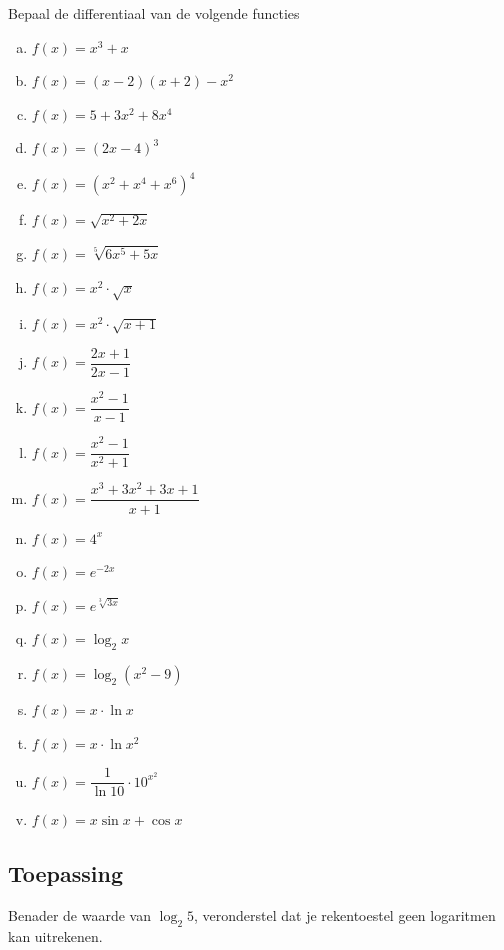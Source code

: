 \documentclass[a4paper,12pt]{article}
\begin{document}
\begin{oefening}
Bepaal de differentiaal van de volgende functies
\begin{multicols}{2}
\begin{enumerate}[(a)]
  \itemsep.5em
  \item $\displaystyle f(x)=x^3+x$
  \item $\displaystyle f(x)=(x-2)(x+2)-x^2$
  \item $\displaystyle f(x)=5+3x^2+8x^4$
  \item $\displaystyle f(x)=\left(2x-4\right)^3$
  \item $\displaystyle f(x)=\left(x^2+x^4+x^6\right)^4$
  \item $\displaystyle f(x)=\sqrt{x^2+2x}$
  \item $\displaystyle f(x)=\sqrt[5]{6x^5+5x}$
  \item $\displaystyle f(x)=x^2\cdot\sqrt{x}$
  \item $\displaystyle f(x)=x^2\cdot\sqrt{x+1}$
  \item $\displaystyle f(x)=\dfrac{2x+1}{2x-1}$
  \item $\displaystyle f(x)=\dfrac{x^2-1}{x-1}$
  \item $\displaystyle f(x)=\dfrac{x^2-1}{x^2+1}$
  \item $\displaystyle f(x)=\dfrac{x^3+3x^2+3x+1}{x+1}$
  \item $\displaystyle f(x)=4^{x}$
  \item $\displaystyle f(x)=e^{-2x}$
  \item $\displaystyle f(x)=e^{\sqrt[3]{3x}}$
  \item $\displaystyle f(x)=\log_2 x$
  \item $\displaystyle f(x)=\log_2 (x^2-9)$
  \item $\displaystyle f(x)=x\cdot \ln x$
  \item $\displaystyle f(x)=x\cdot \ln x^2$
  \item $\displaystyle f(x)=\dfrac{1}{\ln 10}\cdot 10^{x^2}$
  \item $\displaystyle f(x)=x\sin x + \cos x$
\end{enumerate}
\end{multicols}
\end{oefening}

\subsection{Toepassing}

Benader de waarde van $\log_2 5$, veronderstel dat je rekentoestel geen logaritmen kan uitrekenen.
\end{document}
